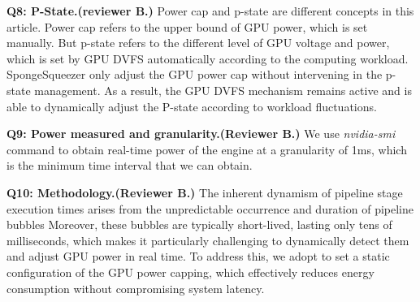 \textbf{Q8: P-State.(reviewer B.)}
Power cap and p-state are different concepts in this article. 
Power cap refers to the upper bound of GPU power, which is set manually.
But p-state refers to the different level of GPU voltage and power, which is set by GPU DVFS automatically according to the computing workload.
SpongeSqueezer only adjust the GPU power cap without intervening in the p-state management. As a result, the GPU DVFS mechanism remains active and is able to dynamically adjust the P-state according to workload fluctuations.



\textbf{Q9: Power measured and granularity.(Reviewer B.)}
We use \textit{nvidia-smi} command to obtain real-time power of the engine at a granularity of 1ms, which is the minimum time interval that we can obtain.


\textbf{Q10: Methodology.(Reviewer B.)}
The inherent dynamism of pipeline stage execution times arises from the unpredictable occurrence and duration of pipeline bubbles
Moreover, these bubbles are typically short-lived, lasting only tens of milliseconds, which makes it particularly challenging to dynamically detect them and adjust GPU power in real time.
To address this, we adopt to set a static configuration of the GPU power capping, which effectively reduces energy consumption without compromising system latency.

